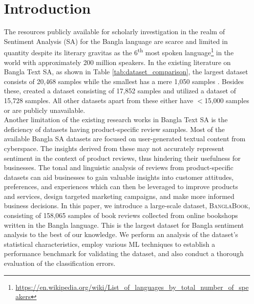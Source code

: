 \section{Introduction}
The resources publicly available for scholarly investigation in the realm of Sentiment Analysis (SA) for the Bangla language are scarce and limited in quantity \citep{khatun2022machine, sazzed2021bengsentilex, rahman2019annotated} despite its literary gravitas as the 6\textsuperscript{th} most spoken language\footnote{\url{https://en.wikipedia.org/wiki/List_of_languages_by_total_number_of_speakers}} in the world with approximately 200 million speakers.
In the existing literature on Bangla Text SA, as shown in Table \ref{tab:dataset_comparison}, the largest dataset consists of 20,468 samples \citep{islam2022emonoba} while the smallest has a mere 1,050 samples \citep{tabassum2019design}. Besides these, \citet{islam2020sentiment} created a dataset consisting of 17,852 samples and \citet{islam2021sentnob} utilized a dataset of 15,728 samples. All other datasets apart from these either have $<$15,000 samples or are publicly unavailable.\\
Another limitation of the existing research works in Bangla Text SA is the deficiency of datasets having product-specific review samples. Most of the available Bangla SA datasets are focused on user-generated textual content from cyberspace. The insights derived from these may not accurately represent sentiment in the context of product reviews, thus hindering their usefulness for businesses. The tonal and linguistic analysis of reviews from product-specific datasets can aid businesses to gain valuable insights into customer attitudes, preferences, and experiences which can then be leveraged to improve products and services, design targeted marketing campaigns, and make more informed business decisions. In this paper, we introduce a large-scale dataset, \textsc{BanglaBook}, consisting of 158,065 samples of book reviews collected from online bookshops written in the Bangla language. This is the largest dataset for Bangla sentiment analysis to the best of our knowledge. We perform an analysis of the dataset's statistical characteristics, employ various ML techniques to establish a performance benchmark for validating the dataset, and also conduct a thorough evaluation of the classification errors.
